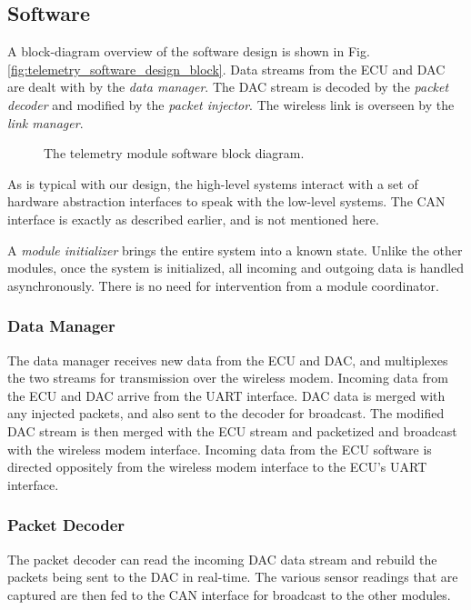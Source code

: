 \subsection{Software}
	
A block-diagram overview of the software design is shown in Fig. \ref{fig:telemetry_software_design_block}. Data streams from the ECU and DAC are dealt with by the \emph{data manager}. The DAC stream is decoded by the \emph{packet decoder} and modified by the \emph{packet injector}. The wireless link is overseen by the \emph{link manager}. 

\begin{figure}[H]
	\centering
	
	\caption{The telemetry module software block diagram.}
	\label{fig:telemetry_software_block}
\end{figure}

As is typical with our design, the high-level systems interact with a set of hardware abstraction interfaces to speak with the low-level systems. The CAN interface is exactly as described earlier, and is not mentioned here.

A \emph{module initializer} brings the entire system into a known state. Unlike the other modules, once the system is initialized, all incoming and outgoing data is handled asynchronously. There is no need for intervention from a module coordinator. 

\subsubsection{Data Manager}

The data manager receives new data from the ECU and DAC, and multiplexes the two streams for transmission over the wireless modem. Incoming data from the ECU and DAC arrive from the UART interface. DAC data is merged with any injected packets, and also sent to the decoder for broadcast. The modified DAC stream is then merged with the ECU stream and packetized and broadcast with the wireless modem interface. Incoming data from the ECU software is directed oppositely from the wireless modem interface to the ECU's UART interface.

\subsubsection{Packet Decoder}
\label{sec:design_telemetry_decoder}

The packet decoder can read the incoming DAC data stream and rebuild the packets being sent to the DAC in real-time. The various sensor readings that are captured are then fed to the CAN interface for broadcast to the other modules.

